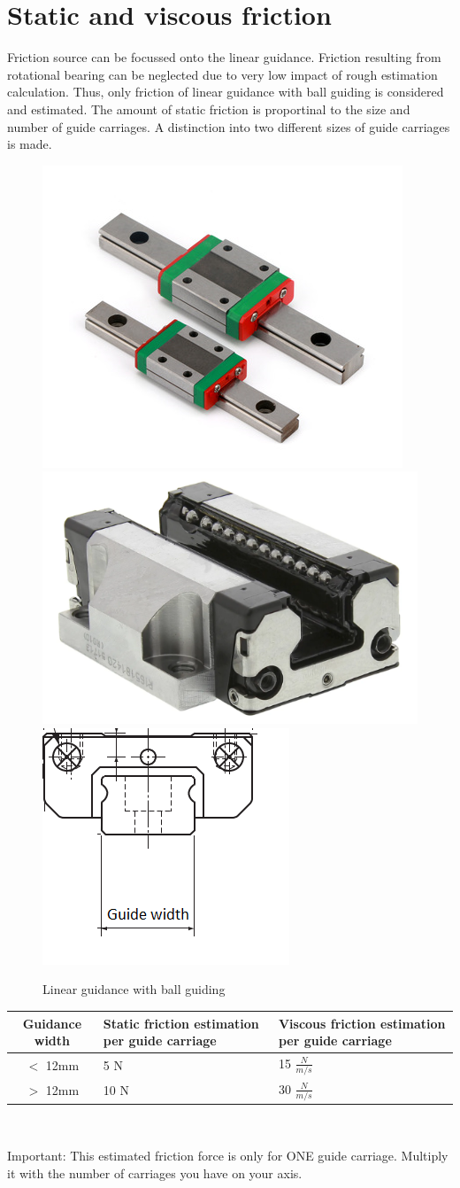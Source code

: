	\section{Static and viscous friction}
		Friction source can be focussed onto the linear guidance. Friction resulting from rotational bearing can be neglected due to very low impact of rough estimation calculation. Thus, only friction of linear guidance with ball guiding is considered and estimated. The amount of static friction is proportinal to the size and number of guide carriages. A distinction into two different sizes of guide carriages is made.
		\begin{figure}[h!]
			\centering
			\includegraphics[width=0.3\linewidth]{./pics/linearguide.png}
			\includegraphics[width=0.25\linewidth]{./pics/ballguid.png}
			\includegraphics[width=0.2\linewidth]{./pics/guidewidth.png}
			\caption{Linear guidance with ball guiding}
		\end{figure}
		\begin{tcolorbox}[title=Friction estimation values]
			\centering
			{\def\arraystretch{2}\tabcolsep=10pt
			\begin{tabular}{c|p{3.5cm}|p{3.7cm}}
				\textbf{Guidance width} & \textbf{Static friction estimation per guide carriage} & \textbf{Viscous friction estimation per guide carriage} \\
				\hline
				$ < $ 12mm & 5 N & 15 $ \frac{N}{m/s} $\\
				$ > $ 12mm & 10 N & 30 $ \frac{N}{m/s} $\\
			\end{tabular}
			\leavevmode\\
			\begin{flushleft}
				Important: This estimated friction force is only for ONE guide carriage. Multiply it with the number of carriages you have on your axis.
			\end{flushleft}
			}
		\end{tcolorbox}
	
